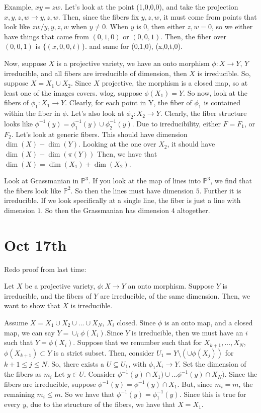 \documentclass[10pt]{article}
\begin{document}
Example, $xy = zw$. Let’s look at the point (1,0,0,0), and take the projection $x,y,z,w \to y,z,w$. Then, since the fibers fix $y,z,w$, it must come from points that look like $zw/y,y,z,w$ when $y \not = 0$. When $y$ is $0$, then either $z,w = 0$, so we either have things that came from $(0,1,0)$ or $(0,0,1)$. Then, the fiber over $(0,0,1)$ is $\{ (x,0,0,t) \}$. and same for (0,1,0), (x,0,t,0).

Now, suppose $X$ is a projective variety, we have an onto morphism $\phi: X \to Y$, $Y$ irreducible, and all fibers are irreducible of dimension, then $X$ is irreducible. So, suppose $X = X_1 \cup X_2$. Since $X$ projective, the morphism is a closed map, so at least one of the images covers. wlog, suppose $\phi(X_1) = Y$. So now, look at the fibers of $\phi_1: X_1 \to Y$. Clearly, for each point in Y, the fiber of $\phi_1$ is contained within the fiber in $\phi$. Let’s also look at $\phi_2: X_2 \to Y$. Clearly, the fiber structure looks like $\phi^{-1}(y) = \phi_1^{-1}(y) \cup \phi_2^{-1}(y) $. Due to irreducibility, either $F = F_1$, or $F_2$. Let’s look at generic fibers. This should have dimension $\dim(X) - \dim(Y)$. Looking at the one over $X_2$, it should have $\dim(X) - \dim(\pi(Y))$ Then, we have that $\dim(X) = \dim(X_1) + \dim(X_2)$.

Look at Grassmanian in $\mathbb{P}^3$. If you look at the map of lines into $\mathbb{P}^3$, we find that the fibers look like $\mathbb{P}^2$. So then the lines must have dimension $5$. Further it is irreducible. If we look specifically at a single line, the fiber is just a line with dimension $1$. So then the Grassmanian has dimension $4$ altogether.

\section{Oct 17th}

Redo proof from last time:

Let $X$ be a projective variety, $\phi: X \to Y$ an onto morphism. Suppose $Y$ is irreducible, and the fibers of $Y$ are irreducible, of the same dimension. Then, we want to show that $X$ is irreducible.

Assume $X = X_1 \cup X_2 \cup ... \cup X_N$, $X_i$ closed. Since $\phi$ is an onto map, and a closed map, we can say $Y = \cup_i \phi(X_i)$.Since $Y$ is irreducible, then we must have an $i$ such that $Y = \phi(X_i)$. Suppose that we renumber such that for $X_{k+1},...,X_N$, $\phi(X_{k+1}) \subset Y$ is a strict subset. Then, consider $U_1 = Y \setminus (\cup \phi(X_j))$ for $k+1 \leq j \leq N$. So, there exists a $U \subseteq U_1$, with $\phi_1 X_i \to Y$. Set the dimension of the fibers as $m_i$ Let $y \in U$. Consider $\phi^{-1}(y) \cap X_1) \cup... \phi^{-1}(y) \cap X_N)$. Since the fibers are irreducible, suppose $\phi^{-1}(y) = \phi^{-1}(y) \cap X_1$. But, since $m_i = m$, the remaining $m_i \leq m$. So we have that $\phi^{-1}(y) = \phi^{-1}_1 (y)$. Since this is true for every $y$, due to the structure of the fibers, we have that $X = X_1$.
\end{document}
